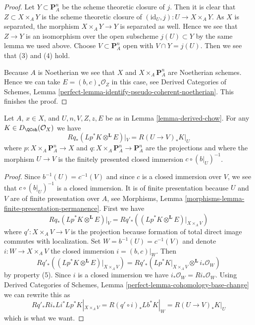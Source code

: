 \begin{proof}
\medskip\noindent
Let $Y \subset \mathbf{P}^n_A$ be the scheme theoretic
closure of $j$. Then it is clear that $Z \subset X \times_A Y$
is the scheme theoretic closure of
$(\text{id}_U, j) : U \to X \times_A Y$.
As $X$ is separated, the morphism
$X \times_A Y \to Y$ is separated as well.
Hence we see that $Z \to Y$ is an isomorphism over
the open subscheme $j(U) \subset Y$ by the same lemma we used above.
Choose $V \subset \mathbf{P}^n_A$ open with $V \cap Y = j(U)$.
Then we see that (3) and (4) hold.

\medskip\noindent
Because $A$ is Noetherian we see that $X$ and $X \times_A \mathbf{P}^n_A$
are Noetherian schemes. Hence we can take $E = (b, c)_*\mathcal{O}_Z$
in this case, see Derived Categories of Schemes, Lemma
\ref{perfect-lemma-identify-pseudo-coherent-noetherian}.
This finishes the proof.
\end{proof}

\begin{lemma}
\label{lemma-compute-Fourier-Mukai-for-derived-chow}
Let $A$, $x \in X$, and
$U, n, V, Z, z, E$ be as in Lemma \ref{lemma-derived-chow}.
For any $K \in D_\QCoh(\mathcal{O}_X)$ we have
$$
Rq_*(Lp^*K \otimes^\mathbf{L} E)|_V = R(U \to V)_*K|_U
$$
where $p : X \times_A \mathbf{P}^n_A \to X$ and
$q : X \times_A \mathbf{P}^n_A \to \mathbf{P}^n_A$ are
the projections and where the morphism $U \to V$ is
the finitely presented closed immersion $c \circ (b|_U)^{-1}$.
\end{lemma}

\begin{proof}
Since $b^{-1}(U) = c^{-1}(V)$ and since $c$ is a closed immersion
over $V$, we see that $c \circ (b|_U)^{-1}$ is a closed immersion.
It is of finite presentation because $U$ and $V$ are of finite
presentation over $A$, see
Morphisms, Lemma \ref{morphisms-lemma-finite-presentation-permanence}.
First we have
$$
Rq_*(Lp^*K \otimes^\mathbf{L} E)|_V =
Rq'_*\left((Lp^*K \otimes^\mathbf{L} E)|_{X \times_A V}\right)
$$
where $q' : X \times_A V \to V$ is the projection because
formation of total direct image commutes with localization.
Set $W = b^{-1}(U) = c^{-1}(V)$ and denote $i : W \to X \times_A V$
the closed immersion $i = (b, c)|_W$. Then
$$
Rq'_*\left((Lp^*K \otimes^\mathbf{L} E)|_{X \times_A V}\right) =
Rq'_*(Lp^*K|_{X \times_A V} \otimes^\mathbf{L} i_*\mathcal{O}_W)
$$
by property (5). Since $i$ is a closed immersion we have
$i_*\mathcal{O}_W = Ri_*\mathcal{O}_W$.
Using
Derived Categories of Schemes,
Lemma \ref{perfect-lemma-cohomology-base-change}
we can rewrite this as
$$
Rq'_* Ri_* Li^* Lp^*K|_{X \times_A V} =
R(q' \circ i)_* Lb^*K|_W =
R(U \to V)_* K|_U
$$
which is what we want.
\end{proof}

